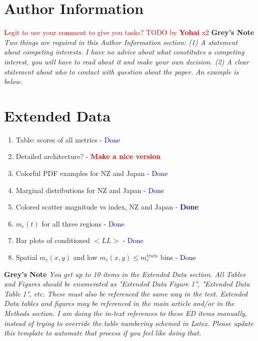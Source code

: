 \documentclass[pdflatex]{sn-jnl}
\newcommand{\yohai}[1]{{\textcolor{red}{#1}}}
\begin{document}
\section*{Author Information}
\yohai{Legit to use your comment to give you tasks? TODO by \textbf{Yohai} x2}
\textbf{Grey's Note} \textit{Two things are required in this Author Information section: (1) A statement about competing interests. I have no advice about what constitutes a competing interest, you will have to read about it and make your own decision. (2) A clear statement about who to contact with question about the paper. An example is below.}


\newpage
\section*{Extended Data}
\begin{enumerate}
    \item Table: scores of all metrics - \textcolor{blue}{Done}
    \item Detailed architecture? - \textcolor{red}{\textbf{Make a nice version}}
    \item Colorful PDF examples for NZ and Japan - \textcolor{blue}{Done}
    \item Marginal distributions for NZ and Japan - \textcolor{blue}{Done}
    \item Colored scatter magnitude vs index, NZ and Japan - \textcolor{blue}{\textbf{Done}}
    \item $m_c(t)$ for all three regions - \textcolor{blue}{Done}
    \item Bar plots of conditioned $<LL>$ - \textcolor{blue}{Done}
    \item Spatial $m_c(x, y)$ and low $m_c(x, y) \leq m_c^{train}$ bins - \textcolor{blue}{Done}
\end{enumerate}

\textbf{Grey's Note} \textit{You get up to 10 items in the Extended Data section. All Tables and Figures should be enumerated as "Extended Data Figure 1", "Extended Data Table 1", etc. These must also be referenced the same way in the text. Extended Data tables and figures may be referenced in the main article and/or in the Methods section. I am doing the in-text references to these ED items manually, instead of trying to override the table numbering schemed in Latex. Please update this template to automate that process if you feel like doing that.}
\end{document}
